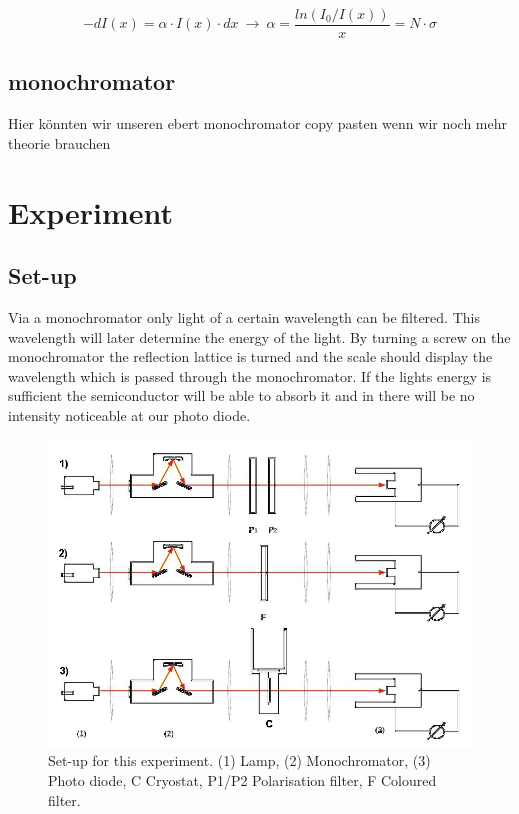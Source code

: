 \documentclass[]{article}
\begin{document}
\begin{equation}
\label{eq:Lambert-Beer}
-dI(x) = \alpha \cdot I(x)\cdot dx\ \rightarrow\ \alpha=\frac{ln(I_0 / I(x))}{x} = N\cdot \sigma
\end{equation}

\subsection{monochromator}
Hier könnten wir unseren ebert monochromator copy pasten wenn wir noch mehr theorie brauchen

\section{Experiment}
\subsection{Set-up}
Via a monochromator only light of a certain wavelength can be filtered. This wavelength will later determine the energy of the light. By turning a screw on the monochromator the reflection lattice is turned and the scale should display the wavelength which is passed through the monochromator. If the lights energy is sufficient the semiconductor will be able to absorb it and in there will be no intensity noticeable at our photo diode. 

\begin{figure}[H]
\centering
\includegraphics[width=.9\textwidth]{Plots/setup.png}
\caption{Set-up for this experiment. (1) Lamp, (2) Monochromator, (3) Photo diode, C Cryostat, P1/P2 Polarisation filter, F Coloured filter. }
\label{fig:setup}
\end{figure}
\end{document}
